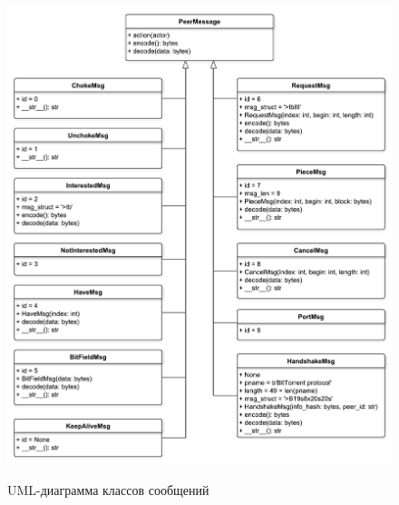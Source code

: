 \begin{figure}[h]
	\begin{center}
		{\includegraphics[scale = 0.57]{img/msgs.pdf}}
		\caption{UML-диаграмма классов сообщений}
		\label{fig301:image}
	\end{center}
\end{figure}